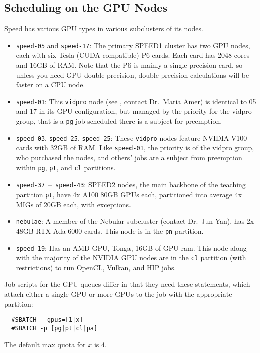 
\subsection{Scheduling on the GPU Nodes}
\label{sect:gpu-scheduling}

Speed has various GPU types in various subclusters of its nodes.

\begin{itemize}
	\item \texttt{speed-05} and \texttt{speed-17}:
The primary SPEED1 cluster has two GPU nodes, each with six Tesla (CUDA-compatible) P6
cards. Each card has 2048 cores and 16GB of RAM. Note that the P6
is mainly a single-precision card, so unless you need GPU double precision, 
double-precision calculations will be faster on a CPU node.
	\item \texttt{speed-01}:
This \texttt{vidpro} node (see , contact Dr.~Maria Amer) is identical
to 05 and 17 in its GPU configuration, but managed by the priority
for the vidpro group, that is a \texttt{pg} job scheduled there
is a subject for preemption.
	\item \texttt{speed-03}, \texttt{speed-25}, \texttt{speed-25}:
These \texttt{vidpro} nodes feature NVIDIA V100 cards with 32GB of RAM.
Like \texttt{speed-01}, the priority is of the vidpro group, who
purchased the nodes, and others' jobs are a subject from preemption
within \texttt{pg}, \texttt{pt}, and \texttt{cl} partitions.
	\item \texttt{speed-37}~--~\texttt{speed-43}:
SPEED2 nodes, the main backbone of the teaching partition \texttt{pt},
have 4x A100 80GB GPUs each, partitioned into average 4x MIGs of 20GB
each, with exceptions.
	\item \texttt{nebulae}:
A member of the Nebular subcluster (contact Dr.~Jun Yan), has 2x 48GB
RTX Ada 6000 cards. This node is in the \texttt{pn} partition.
	\item \texttt{speed-19}:
Has an AMD GPU, Tonga, 16GB of GPU ram.
This node along with the majority of the NVIDIA GPU nodes are in the
\texttt{cl} partition (with restrictions) to run OpenCL, Vulkan,
and HIP jobs.
\end{itemize}

\noindent
Job scripts for the GPU queues differ in that they need these statements,
which attach either a single GPU or more GPUs to the job with the
appropriate partition:
\begin{verbatim}
  #SBATCH --gpus=[1|x]
  #SBATCH -p [pg|pt|cl|pa]
\end{verbatim}
The default max quota for $x$ is 4.

